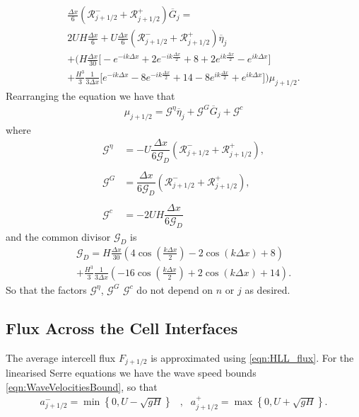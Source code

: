 \begin{multline*}
\frac{\Delta x}{6} \left(\mathcal{R}^-_{j +1/2} + \mathcal{R}^+_{j +1/2} \right) \overline{G}_j =  \\
2UH\frac{\Delta x}{6}   + U\frac{\Delta x}{6} \left(\mathcal{R}^-_{j +1/2} + \mathcal{R}^+_{j +1/2} \right) \overline{\eta}_j\\ +   \Bigg(H\frac{\Delta x}{30} \Bigg[ -e^{-ik\Delta x } +  2 e^{-ik\frac{\Delta x}{2}}  + 8 + 2 e^{ik\frac{\Delta x}{2}} - e^{ik{\Delta x}}  \Bigg]   \\ + \frac{H^3 }{3}\frac{1 }{3\Delta x} \Bigg[  e^{-ik{\Delta x}} -8e^{-ik\frac{\Delta x}{2}} + 14  - 8 e^{ik\frac{\Delta x}{2}} + e^{ik{\Delta x}}  \Bigg]    \Bigg) \mu_{j+1/2}. 
\end{multline*}
Rearranging the equation we have that
\begin{align}
\label{eqn:2ndFEMutoG}
\mu_{j+1/2} =  \mathcal{G}^{\eta} \overline{\eta}_{j} + \mathcal{G}^G \overline{G}_{j} + \mathcal{G}^c 
\end{align}
where
\begin{align*}
\mathcal{G}^\eta &=  -U\dfrac{\Delta x}{6\mathcal{G}_D } \left(\mathcal{R}^-_{j +1/2} + \mathcal{R}^+_{j +1/2} \right), \\ \\
\mathcal{G}^G &= \dfrac{\Delta x}{6\mathcal{G}_D } \left(\mathcal{R}^-_{j +1/2} + \mathcal{R}^+_{j +1/2} \right), \\ \\
\mathcal{G}^c &=  -2UH \dfrac{\Delta x}{6\mathcal{G}_D }
\end{align*}
and the common divisor $\mathcal{G}_D$ is
\begin{multline*}
\mathcal{G}_D = H\frac{\Delta x}{30} \left(4\cos\left(\frac{k \Delta x}{2}\right) - 2\cos\left({k \Delta x}\right) + 8\right) \\ + \frac{H^3 }{3}\frac{1}{3\Delta x}\left(-16\cos\left(\frac{k\Delta x}{2}\right) + 2 \cos\left(k \Delta x\right) + 14\right).
\end{multline*}
So that the factors $\mathcal{G}^\eta$, $\mathcal{G}^G$ $\mathcal{G}^c$ do not depend on $n$ or $j$ as desired.

\subsection{Flux Across the Cell Interfaces}
The average intercell flux $F_{j+1/2}$ is approximated using \eqref{eqn:HLL_flux}. For the linearised Serre equations we have the wave speed bounds \eqref{eqn:WaveVelocitiesBound}, so that
\begin{align}
a^-_{j+ 1/2} = \min \left\lbrace 0,  U - \sqrt{g H} \right \rbrace&, &a^+_{j+ 1/2} =  \max \left\lbrace 0, U + \sqrt{g H} \right \rbrace .
\label{eqn:wavespeedboundslinSerre}
\end{align}

